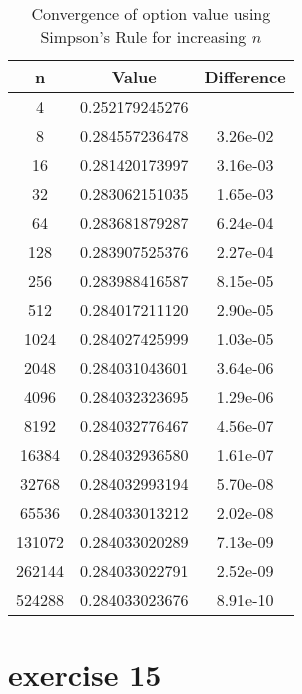 \documentclass{article}
\begin{document}
\begin{table}[h!]
    \centering
    \begin{tabular}{ccc}
        \toprule
        \textbf{n} & \textbf{Value} & \textbf{Difference} \\
        \midrule
        4          & 0.252179245276 & {}                  \\
        8          & 0.284557236478 & 3.26e-02            \\
        16         & 0.281420173997 & 3.16e-03            \\
        32         & 0.283062151035 & 1.65e-03            \\
        64         & 0.283681879287 & 6.24e-04            \\
        128        & 0.283907525376 & 2.27e-04            \\
        256        & 0.283988416587 & 8.15e-05            \\
        512        & 0.284017211120 & 2.90e-05            \\
        1024       & 0.284027425999 & 1.03e-05            \\
        2048       & 0.284031043601 & 3.64e-06            \\
        4096       & 0.284032323695 & 1.29e-06            \\
        8192       & 0.284032776467 & 4.56e-07            \\
        16384      & 0.284032936580 & 1.61e-07            \\
        32768      & 0.284032993194 & 5.70e-08            \\
        65536      & 0.284033013212 & 2.02e-08            \\
        131072     & 0.284033020289 & 7.13e-09            \\
        262144     & 0.284033022791 & 2.52e-09            \\
        524288     & 0.284033023676 & 8.91e-10            \\
        \bottomrule
    \end{tabular}
    \caption{Convergence of option value using Simpson's Rule for increasing \( n \)}
\end{table}

\section{exercise 15}
\end{document}
